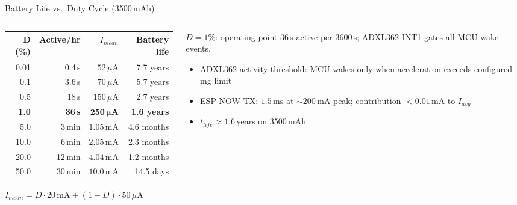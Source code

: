 

\begin{frame}{Battery Life vs.\ Duty Cycle (3500\,mAh)}
\begin{columns}[T,onlytextwidth]
\begin{column}{0.60\textwidth}
\centering
\renewcommand{\arraystretch}{1.5}
{\small
\setlength{\tabcolsep}{8pt}
\begin{tabular}{r r r r}
\toprule
\textbf{D (\%)} & \textbf{Active/hr} & \textbf{$I_{mean}$} & \textbf{Battery life} \\
\midrule
0.01 & 0.4\,s  & $52\,\mu\text{A}$  & 7.7 years \\
0.1  & 3.6\,s  & $70\,\mu\text{A}$  & 5.7 years \\
0.5  & 18\,s   & $150\,\mu\text{A}$ & 2.7 years \\
\rowcolor{sintefgreen!30}
\textbf{1.0} & \textbf{36\,s} & $\mathbf{250\,\mu\text{A}}$ & \textbf{1.6 years} \\
5.0  & 3\,min  & $1.05\,\text{mA}$  & 4.6 months \\
10.0 & 6\,min  & $2.05\,\text{mA}$  & 2.3 months \\
20.0 & 12\,min & $4.04\,\text{mA}$  & 1.2 months \\
50.0 & 30\,min & $10.0\,\text{mA}$  & 14.5 days \\
\bottomrule
\end{tabular}
}
\vspace{0.3cm}
{\small $I_{mean} = D \cdot 20\,\text{mA} + (1-D) \cdot 50\,\mu\text{A}$}
\end{column}
\begin{column}{0.36\textwidth}
  \begin{block}{$D = 1\%$: operating point}
  \small 36\,s active per 3600\,s; ADXL362 INT1 gates all MCU wake events.
  \end{block}
  \vspace{0.4cm}
  \begin{itemize}\setlength\itemsep{8pt}
  \small
    \item ADXL362 activity threshold: MCU wakes only when acceleration exceeds configured mg limit
    \item ESP-NOW TX: $1.5$\,ms at ${\sim}200$\,mA peak; contribution $<0.01$\,mA to $I_{avg}$
    \item $t_{life} \approx \mathbf{1.6}$\,years on 3500\,mAh
  \end{itemize}
\end{column}
\end{columns}
\end{frame}

